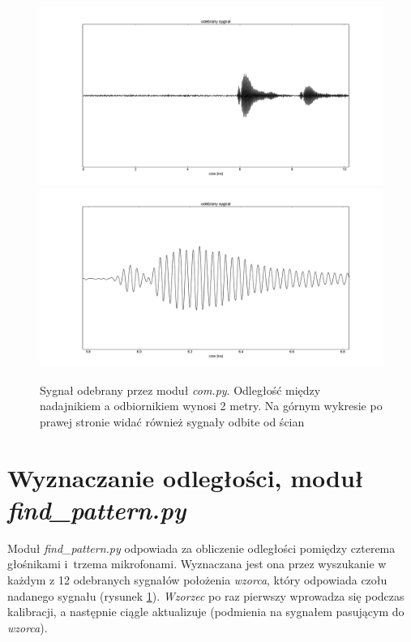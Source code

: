 \begin{figure}[h!]
    \centering
    \includegraphics[width=1.13\textwidth, trim= 53mm 0mm 0mm 0mm,clip]{com_output_2m_1}
    \includegraphics[width=1.13\textwidth, trim= 53mm 0mm 0mm 0mm,clip]{com_output_2m_2}
    \caption{Sygnał odebrany przez moduł \textit{com.py}. 
    Odległość między nadajnikiem a odbiornikiem wynosi 2 metry.
    Na górnym wykresie po prawej stronie widać również sygnały odbite od ścian}
    \label{fig:com_output_2m}
\end{figure}

\newpage
\section{Wyznaczanie odległości, moduł \textit{find\_pattern.py}}

Moduł \textit{find\_pattern.py} odpowiada za obliczenie odległości pomiędzy czterema głośnikami i~trzema mikrofonami.
Wyznaczana jest ona przez wyszukanie w każdym z 12 odebranych sygnałów  położenia \textit{wzorca}, który 
odpowiada czołu nadanego sygnału (rysunek \ref{fig:com_output_2m}).
\textit{Wzorzec} po raz pierwszy wprowadza się podczas kalibracji, a następnie ciągle aktualizuje 
(podmienia na sygnałem pasującym do \textit{wzorca}).

